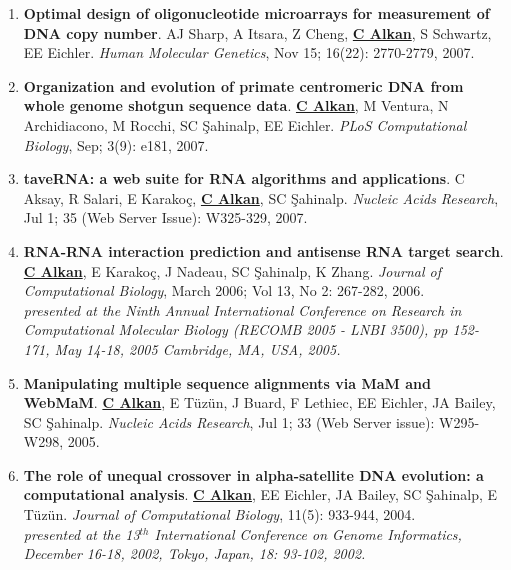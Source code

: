 \begin{enumerate}
\item
 {\bf Optimal design of oligonucleotide microarrays for measurement of DNA copy number}.
 AJ Sharp, A Itsara, Z Cheng, {\bf {\underline{C Alkan}}}, S Schwartz, EE Eichler.
 {\em Human Molecular Genetics}, Nov 15;  16(22): 2770-2779, 2007.



\item
 {\bf Organization and evolution of primate centromeric DNA from whole genome shotgun sequence data}.
 {\bf {\underline{C Alkan}}}, M Ventura, N Archidiacono, M Rocchi, SC \c{S}ahinalp, EE Eichler.
 {\em PLoS Computational Biology}, Sep;  3(9): e181, 2007.


\item
 {\bf taveRNA: a web suite for RNA algorithms and applications}.
  C Aksay, R Salari, E Karako\c{c}, {\bf {\underline{C Alkan}}}, SC \c{S}ahinalp.
  {\em Nucleic Acids Research}, Jul 1;  35 (Web Server Issue): W325-329, 2007.

\clearpage
\item
 {\bf RNA-RNA interaction prediction and antisense RNA target search}.
  {\bf {\underline{C Alkan}}}, E Karako\c{c}, J Nadeau, SC \c{S}ahinalp,
  K Zhang.
  {\em Journal of Computational Biology}, March 2006;  Vol 13, No 2: 267-282, 2006. \\
\hspace*{1cm} {\footnotesize {\it presented at the Ninth Annual International Conference on Research in Computational Molecular Biology
    (RECOMB 2005 - LNBI 3500), pp 152-171, 
    May 14-18, 2005 Cambridge, MA, USA, 2005.}}


\item
{\bf Manipulating multiple sequence alignments via MaM and  WebMaM}.
{\bf {\underline{C Alkan}}}, E T\"{u}z\"{u}n, J Buard, F Lethiec,
EE Eichler, JA Bailey, SC \c{S}ahinalp.
{\em Nucleic Acids Research}, Jul 1;  33 (Web Server issue):
W295-W298, 2005.

\item
 {\bf The role of unequal crossover in alpha-satellite 
   DNA evolution: a computational analysis}.
  {\bf {\underline{C Alkan}}}, EE Eichler, JA Bailey, SC \c{S}ahinalp, E T\"{u}z\"{u}n.
  {\em Journal of Computational Biology}, 11(5): 933-944, 2004. \\
\hspace*{1cm}  {\footnotesize {\it presented at the 13$^{th}$ International Conference on Genome Informatics, 
December 16-18, 2002, Tokyo, Japan, 18: 93-102, 2002.}}


\end{enumerate}
